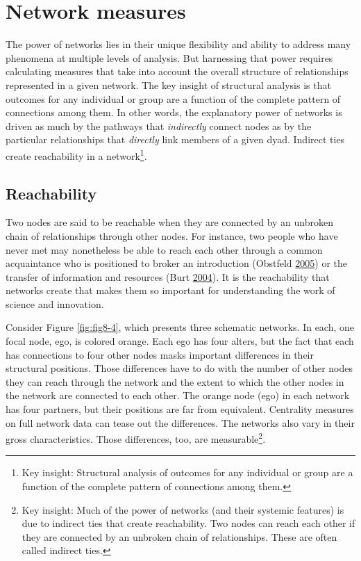 \documentclass[]{krantz}
\begin{document}
\section{Network measures}\label{network-measures}

The power of networks lies in their unique flexibility and ability to
address many phenomena at multiple levels of analysis. But harnessing
that power requires calculating measures that take into account the
overall structure of relationships represented in a given network. The
key insight of structural analysis is that outcomes for any individual
or group are a function of the complete pattern of connections among
them. In other words, the explanatory power of networks is driven as
much by the pathways that \emph{indirectly} connect nodes as by the
particular relationships that \emph{directly} link members of a given
dyad. Indirect ties create reachability in a network\footnote{Key
  insight: Structural analysis of outcomes for any individual or group
  are a function of the complete pattern of connections among them.}.

\subsection{Reachability}\label{reachability}

Two nodes are said to be reachable when they are connected by an
unbroken chain of relationships through other nodes. For instance, two
people who have never met may nonetheless be able to reach each other
through a common acquaintance who is positioned to broker an
introduction (Obstfeld \protect\hyperlink{ref-obstfeld2005social}{2005})
or the transfer of information and resources (Burt
\protect\hyperlink{ref-burt2004structural}{2004}). It is the
reachability that networks create that makes them so important for
understanding the work of science and innovation.

Consider Figure \ref{fig:fig8-4}, which presents three schematic
networks. In each, one focal node, ego, is colored orange. Each ego has
four alters, but the fact that each has connections to four other nodes
masks important differences in their structural positions. Those
differences have to do with the number of other nodes they can reach
through the network and the extent to which the other nodes in the
network are connected to each other. The orange node (ego) in each
network has four partners, but their positions are far from equivalent.
Centrality measures on full network data can tease out the differences.
The networks also vary in their gross characteristics. Those
differences, too, are measurable\footnote{Key insight: Much of the power
  of networks (and their systemic features) is due to indirect ties that
  create reachability. Two nodes can reach each other if they are
  connected by an unbroken chain of relationships. These are often
  called indirect ties.}.
\end{document}
